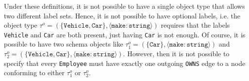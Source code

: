 \documentclass[a4paper]{article}
\newcommand{\otype}{\tau^o}
\begin{document}

Under these definitions, it is not possible to have a single object type that allows two different label sets. Hence, it is not possible to have optional labels, i.e. the object type $\otype = (\{\texttt{Vehicle}, \texttt{Car}\}, \langle \texttt{make} : \texttt{string} \rangle)$ requires that the labels \texttt{Vehicle} and \texttt{Car} are both present, just having \texttt{Car} is not enough. Of course, it is possible to have two schema objects like $\otype_1 = (\{\texttt{Car}\}, \langle \texttt{make} : \texttt{string} \rangle)$ and $\otype_2 = (\{\texttt{Vehicle}, \texttt{Car}\}, \langle \texttt{make} : \texttt{string} \rangle)$. However, then it is not possible to specify that every \texttt{Employee} must have exactly one outgoing \texttt{OWNS} edge to a node conforming to either $\otype_1$ or $\otype_2$.

\end{document}

